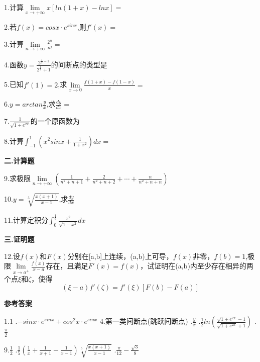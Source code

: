 \documentclass{ctexart}
\begin{document}
1.计算$\lim\limits_{x\rightarrow +\infty}x[ln(1+x)-lnx]=$\underline{\hspace{3em}}

2.若$f(x)=cosx\cdot e^{sinx}$,则$f'(x)=$\underline{\hspace{3em}}

3.计算$\lim\limits_{n\rightarrow +\infty}\frac{2^{n}}{n!}=$\underline{\hspace{3em}}

4.函数$y=\frac{2^{\frac{1}{x}-1}}{2^{\frac{1}{x}}+1}$的间断点的类型是\underline{\hspace{3em}}

5.已知$f'(1)=2$,求$\lim\limits_{x\rightarrow 0}\frac{f(1+x)-f(1-x)}{x}=$\underline{\hspace{3em}}

6.$y=arctan\frac{y}{x}$,求$\frac{dy}{dx}=$\underline{\hspace{3em}}

7.$\frac{1}{\sqrt{1+e^{2x}}}$的一个原函数为\underline{\hspace{3em}}

8.计算$\int_{-1}^{1}(x^{2}sinx+\frac{1}{1+x^{2}})dx=$\underline{\hspace{3em}}

\textbf{二.计算题}

9.求极限$\lim\limits_{n\rightarrow +\infty}(\frac{1}{n^{2}+n+1}+\frac{2}{n^{2}+n+2}+\cdots +\frac{n}{n^{2}+n+n})$

10.$y=\sqrt[5]{\frac{x(x+1)}{x-1}}$,求$\frac{dy}{dx}$

11.计算定积分$\int_{0}^{\frac{1}{2}}\frac{x^{2}}{\sqrt{1-x^{2}}}dx$

\textbf{三.证明题}

12.设$f(x)$和$F(x)$分别在[a,b]上连续，(a,b)上可导，$f(x)$非零，$f(b)=1$,极限$\lim\limits_{x\rightarrow a^{+}}\frac{f(x)}{x-a}$存在，且满足$F'(x)=f(x)$，试证明在(a,b)内至少存在相异的两个点$\xi$和$\zeta$，使得
$$(\xi-a)f'(\zeta)=f'(\xi)[F(b)-F(a)]$$


\begin{center}
\textbf{参考答案}
\end{center}
1.1 .$-sinx\cdot e^{sinx}+cos^{2}x\cdot e^{sinx}$    \qquad 4.第一类间断点(跳跃间断点)  
.$\frac{y}{x}$  .$\frac{1}{2}ln(\frac{\sqrt{1+e^{2x}}-1}{\sqrt{1+e^{2x}}+1})$  .$\frac{\pi}{2}$

9.$\frac{1}{2}$  .$\frac{1}{5}(\frac{1}{x}+\frac{1}{x+1}-\frac{1}{x-1})\sqrt[5]{\frac{x(x+1)}{x-1}}$  .$\frac{\pi}{12}-\frac{\sqrt{3}}{8}$
\end{document}
